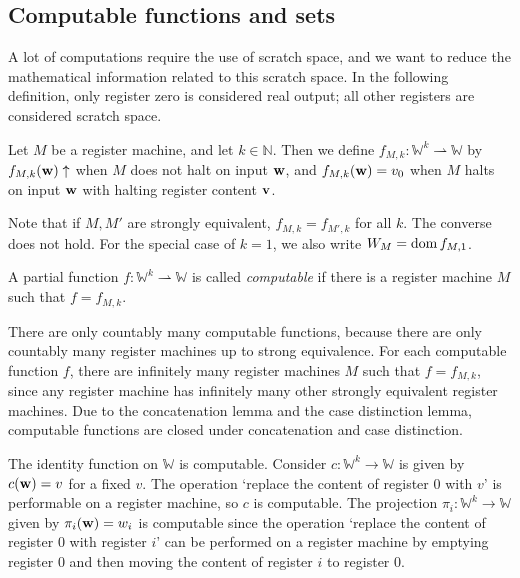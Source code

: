 \subsection{Computable functions and sets}
\begin{remark}
	A lot of computations require the use of scratch space, and we want to reduce the mathematical information related to this scratch space.
	In the following definition, only register zero is considered real output; all other registers are considered scratch space.
\end{remark}
\begin{definition}
	Let \( M \) be a register machine, and let \( k \in \mathbb N \).
	Then we define \( f_{M,k} \colon \mathbb W^k \rightharpoonup \mathbb W \) by \( f_{M,k}(\vb w) \uparrow \) when \( M \) does not halt on input \( \vb w \), and \( f_{M,k}(\vb w) = v_0 \) when \( M \) halts on input \( \vb w \) with halting register content \( \vb v \).
\end{definition}
Note that if \( M, M' \) are strongly equivalent, \( f_{M,k} = f_{M',k} \) for all \( k \).
The converse does not hold.
For the special case of \( k = 1 \), we also write \( W_M = \operatorname{dom} f_{M,1} \).
\begin{definition}
	A partial function \( f \colon \mathbb W^k \rightharpoonup \mathbb W \) is called \emph{computable} if there is a register machine \( M \) such that \( f = f_{M,k} \).
\end{definition}
\begin{remark}
	There are only countably many computable functions, because there are only countably many register machines up to strong equivalence.
	For each computable function \( f \), there are infinitely many register machines \( M \) such that \( f = f_{M,k} \), since any register machine has infinitely many other strongly equivalent register machines.
	Due to the concatenation lemma and the case distinction lemma, computable functions are closed under concatenation and case distinction.
\end{remark}
\begin{example}
	The identity function on \( \mathbb W \) is computable.
	Consider \( c \colon \mathbb W^k \to \mathbb W \) is given by \( c(\vb w) = v \) for a fixed \( v \).
	The operation `replace the content of register \( 0 \) with \( v \)' is performable on a register machine, so \( c \) is computable.
	The projection \( \pi_i \colon \mathbb W^k \to \mathbb W \) given by \( \pi_i(\vb w) = w_i \) is computable since the operation `replace the content of register \( 0 \) with register \( i \)' can be performed on a register machine by emptying register \( 0 \) and then moving the content of register \( i \) to register \( 0 \).
\end{example}

